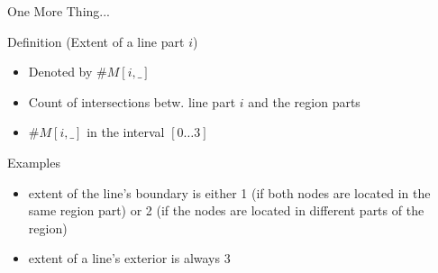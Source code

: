 	\begin{frame}{One More Thing...}
		\begin{block}{Definition (Extent of a line part $i$)}
			\begin{itemize}
				\item Denoted by $\#M[i, \_]$
				\item Count of intersections betw. line part $i$ and the region parts
				\item $\#M[i, \_]$ in the interval $[0\dots 3]$
			\end{itemize}
		\end{block}
		\begin{block}{Examples}
			\begin{itemize}
				\item extent of the line's boundary is either 1 (if both nodes are located in the same region part) or 2 (if the nodes are located in different parts of the region)
				\item extent of a line's exterior is always 3
			\end{itemize}
		\end{block}
	\end{frame}

	
